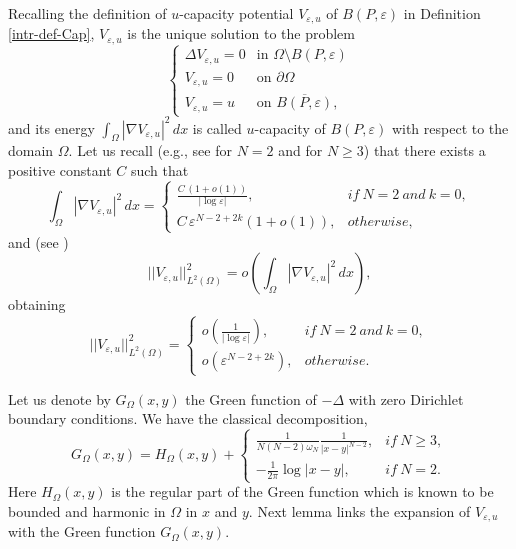 \documentclass[11pt,reqno]{article}
\numberwithin{equation}{section}
\newcommand\e\varepsilon
\renewcommand\O\Omega
\begin{document}
    
    Recalling the definition of $u$-capacity potential $V_{\e,u}$ of  $B(P,\e)$ in Definition \ref{intr-def-Cap}, $V_{\e,u}$ is the unique solution to the problem
	\begin{equation}\label{eq:Veproblem}
		\begin{cases}
			\Delta V_{\e,u} =0 &\text{in }\Omega\setminus B(P,\e)\\
			V_{\e,u} =0 &\text{on }\partial \Omega\\
			V_{\e,u} =u &\text{on }\overline{ B(P,\e)},
		\end{cases}
	\end{equation}
 and its energy $\int_{\Omega} |\nabla V_{\e,u}|^2\,dx$  is called $u$-capacity of $B(P,\e)$ with respect to the domain $\Omega$. 
	 Let us recall (e.g., see \cite[Theorem 1.13]{afhl} for $N=2$ and \cite[Theorem 1.6]{alm2} for $N\ge3$)  that there exists a positive constant $ C$  such that 
  \begin{equation}\label{capu}
         \int_{\Omega} |\nabla V_{\e,u}|^2\,dx=
         \begin{cases}
           \displaystyle \frac{ C\,(1+o(1))}{|\log\e|} , &if \ N=2\ and\ k=0,\\
           \displaystyle C\,\e^{N-2+2k}(1+o(1)),& otherwise,
         \end{cases}
    \end{equation}
    and (see \cite[Lemma A.1]{afhl})
	\begin{equation*}
	||V_{\e,u}||^2_{L^2(\Omega)} = o\left( \int_{\Omega} |\nabla V_{\e,u}|^2\,dx \right),
	\end{equation*}
    obtaining
     \begin{equation}\label{eq:normaL2Ve}
         ||V_{\e,u}||^2_{L^2(\Omega)}=
         \begin{cases}
           \displaystyle o\left(\frac{1}{|\log\e|}\right) , &if \ N=2\ and\ k=0,\\
           \displaystyle o\left(\e^{N-2+2k}\right),& otherwise.
         \end{cases}
    \end{equation}
    
    
	Let us denote by $G_\O(x,y)$ the Green function of $-\Delta$ with zero Dirichlet boundary conditions. We have the classical decomposition,
	\begin{equation}\label{green}
		G_\O(x,y)=H_\O(x,y)+ 
		\begin{cases}
			\frac1{N(N-2)\omega_N}\frac1{|x-y|^{N-2}},&if\ N\ge3,\\
			-\frac1{2\pi}\log|x-y|,& if\  N=2.
		\end{cases}
	\end{equation}
	Here $H_\O(x,y)$ is the regular part of the Green function which is known to be bounded and harmonic in $\O$ in $x$ and $y$. Next lemma links the expansion of 
$V_{\e,u}$ with the Green function $G_\O(x,y)$.
\end{document}
